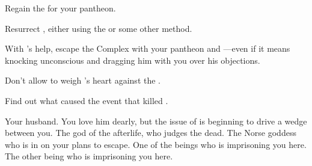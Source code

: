 \documentclass[char]{guardians}
\begin{document}


\begin{itemz}[Goals]
  \item Regain the \iNecro{} for your pantheon.
  \item Resurrect \cSet{}, either using the \iNecro{\MYname} or some other method.
  \item With \cSet{}'s help, escape the Complex with your pantheon and \cHel{}---even if it means knocking \cOsiris{} unconscious and dragging him with you over his objections.
  \item Don't allow \cAnubis{} to weigh \cEgyptianHuman{}'s heart against the \iFeather{\MYname}.
  \item Find out what caused the event that killed \cEgyptianHuman{}.
\end{itemz}

\begin{contacts}
  \contact{\cOsiris{}} Your husband. You love him dearly, but the issue of \cSet{} is beginning to drive a wedge between you.
  \contact{\cAnubis{}} The god of the afterlife, who judges the dead.
  \contact{\cHel{}} The Norse goddess who is in on your plans to escape.
  \contact{\cCaretaker{}} One of the beings who is imprisoning you here.
  \contact{\cWarden{}} The other being who is imprisoning you here.
\end{contacts}
\end{document}
